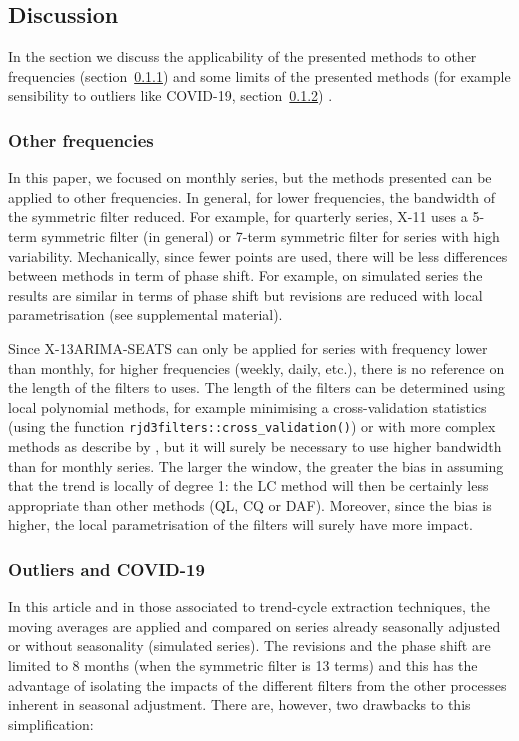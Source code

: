 \documentclass[
]{article}
\newcommand\1{\mathds{1}}
\begin{document}
\subsection{Discussion}\label{discussion}

In the section we discuss the applicability of the presented methods to
other frequencies (section~\ref{sec-other-freq}) and some limits of the
presented methods (for example sensibility to outliers like COVID-19,
section~\ref{sec-out-covid}) .

\subsubsection{Other frequencies}\label{sec-other-freq}

In this paper, we focused on monthly series, but the methods presented
can be applied to other frequencies. In general, for lower frequencies,
the bandwidth of the symmetric filter reduced. For example, for
quarterly series, X-11 uses a 5-term symmetric filter (in general) or
7-term symmetric filter for series with high variability. Mechanically,
since fewer points are used, there will be less differences between
methods in term of phase shift. For example, on simulated series the
results are similar in terms of phase shift but revisions are reduced
with local parametrisation (see supplemental material).

Since X-13ARIMA-SEATS can only be applied for series with frequency
lower than monthly, for higher frequencies (weekly, daily, etc.), there
is no reference on the length of the filters to uses. The length of the
filters can be determined using local polynomial methods, for example
minimising a cross-validation statistics (using the function
\texttt{rjd3filters::cross\_validation()}) or with more complex methods
as describe by \textcite{Loader1999}, but it will surely be necessary to
use higher bandwidth than for monthly series. The larger the window, the
greater the bias in assuming that the trend is locally of degree 1: the
LC method will then be certainly less appropriate than other methods
(QL, CQ or DAF). Moreover, since the bias is higher, the local
parametrisation of the filters will surely have more impact.

\subsubsection{Outliers and COVID-19}\label{sec-out-covid}

In this article and in those associated to trend-cycle extraction
techniques, the moving averages are applied and compared on series
already seasonally adjusted or without seasonality (simulated series).
The revisions and the phase shift are limited to 8 months (when the
symmetric filter is 13 terms) and this has the advantage of isolating
the impacts of the different filters from the other processes inherent
in seasonal adjustment. There are, however, two drawbacks to this
simplification:
\end{document}
